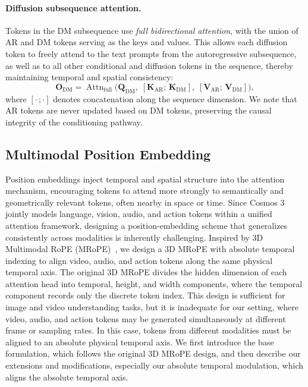 \paragraph{Diffusion subsequence attention.}
Tokens in the DM subsequence use \emph{full bidirectional attention}, with the union of AR and DM tokens serving as the keys and values. This allows each diffusion token to freely attend to the text prompts from the autoregressive subsequence, as well as to all other conditional and diffusion tokens in the sequence, thereby maintaining temporal and spatial consistency:
\begin{equation}
    \mathbf{O}_\text{DM} = \operatorname{Attn}_\text{full}\!\bigl(
        \mathbf{Q}_\text{DM},\;
        [\mathbf{K}_\text{AR};\,\mathbf{K}_\text{DM}],\;
        [\mathbf{V}_\text{AR};\,\mathbf{V}_\text{DM}]
    \bigr),
    \label{eq::df_attn}
\end{equation}
where $[\cdot \,; \cdot]$ denotes concatenation along the sequence dimension. We note that AR tokens are never updated based on DM tokens, preserving the causal integrity of the conditioning pathway.

\subsection{Multimodal Position Embedding}
Position embeddings inject temporal and spatial structure into the attention mechanism, encouraging tokens to attend more strongly to semantically and geometrically relevant tokens, often nearby in space or time. Since Cosmos 3 jointly models language, vision, audio, and action tokens within a unified attention framework, designing a position-embedding scheme that generalizes consistently across modalities is inherently challenging. Inspired by 3D Multimodal RoPE (MRoPE)~\citep{bai2025qwen3}, we design a 3D MRoPE with absolute temporal indexing to align video, audio, and action tokens along the same physical temporal axis. The original 3D MRoPE divides the hidden dimension of each attention head into temporal, height, and width components, where the temporal component records only the discrete token index. This design is sufficient for image and video understanding tasks, but it is inadequate for our setting, where video, audio, and action tokens may be generated simultaneously at different frame or sampling rates. In this case, tokens from different modalities must be aligned to an absolute physical temporal axis. We first introduce the base formulation, which follows the original 3D MRoPE design, and then describe our extensions and modifications, especially our absolute temporal modulation, which aligns the absolute temporal axis.

